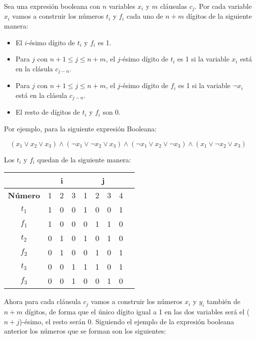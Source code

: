 \documentclass[11pt]{article}
\begin{document}
    Sea una expresión booleana con $n$ variables $x_i$ y $m$ cláusulas $c_j$. Por cada variable $x_i$ vamos
    a construir los números $t_i$ y $f_i$ cada uno de $n+m$ dígitos de la siguiente manera:

    \begin{itemize}
        \item El $i$-ésimo dígito de $t_i$ y $f_i$ es 1.
        \item Para $j$ con $n+1 \leq j \leq n+m$, el $j$-ésimo dígito de $t_i$ es 1 si la variable $x_i$ está
              en la clásula $c_{j-n}$.
        \item Para $j$ con $n+1 \leq j \leq n+m$, el $j$-ésimo dígito de $f_i$ es 1 si la variable $\neg x_i$ está
              en la clásula $c_{j-n}$.
        \item El resto de dígitos de $t_i$ y $f_i$ son 0.
    \end{itemize}

    \newpage

    Por ejemplo, para la siguiente expresión Booleana:

    \[
    (x_1 \vee x_2 \vee x_3) \wedge (\neg x_1 \vee \neg x_2 \vee x_3) \wedge (\neg x_1 \vee x_2 \vee \neg x_3)
    \wedge (x_1 \vee \neg x_2 \vee x_3)
    \]

    Los $t_i$ y $f_i$ quedan de la siguiente manera:


    \begin{table}[!h]
        \centering
        \begin{tabular}{|c|c|c|c|c|c|c|c|c|}
        \hline
        \multicolumn{1}{|c|}{} & \multicolumn{3}{c|}{\textbf{i}} & \multicolumn{4}{c|}{\textbf{j}} \\ \hline
        \textbf{Número} & 1 & 2 & 3 & 1 & 2 & 3 & 4 \\ \hline
        $t_1$ & 1 & 0 & 0 & 1 & 0 & 0 & 1 \\ \hline
        $f_1$ & 1 & 0 & 0 & 0 & 1 & 1 & 0 \\ \hline
        $t_2$ & 0 & 1 & 0 & 1 & 0 & 1 & 0 \\ \hline
        $f_2$ & 0 & 1 & 0 & 0 & 1 & 0 & 1 \\ \hline
        $t_3$ & 0 & 0 & 1 & 1 & 1 & 0 & 1 \\ \hline
        $f_3$ & 0 & 0 & 1 & 0 & 0 & 1 & 0 \\ \hline
        \end{tabular}
    \end{table}

    Ahora para cada cláusula $c_j$ vamos a construir los números $x_i$ y $y_i$ también de $n+m$ dígitos, de forma que
    el único dígito igual a 1 en las dos variables será el ($n+j$)-ésimo, el resto serán 0. Siguiendo el ejemplo
    de la expresión booleana anterior los números que se forman son los siguientes:
\end{document}
